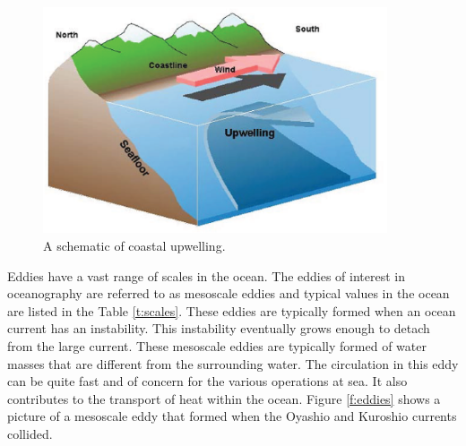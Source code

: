 \begin{center}
\begin{figure}[h!]
\centering
  \includegraphics[width=4in]{Images/Upwelling}
  \caption[Coastal Upwelling]{A schematic of coastal upwelling. \cite{Wiki}}\label{f:upwelling}
\end{figure}
\end{center}

Eddies have a vast range of scales in the ocean.  The eddies of interest in oceanography are referred to as mesoscale eddies and typical values in the ocean are listed in the Table \ref{t:scales}.  These eddies are typically formed when an ocean current has an instability.  This instability eventually grows enough to detach from the large current.  These mesoscale eddies are typically formed of water masses that are different from the surrounding water.  The circulation in this eddy can be quite fast and of concern for the various operations at sea.  It also contributes to the transport of heat within the ocean.  Figure \ref{f:eddies} shows a picture of a mesoscale eddy that formed when the Oyashio and Kuroshio currents collided.  

